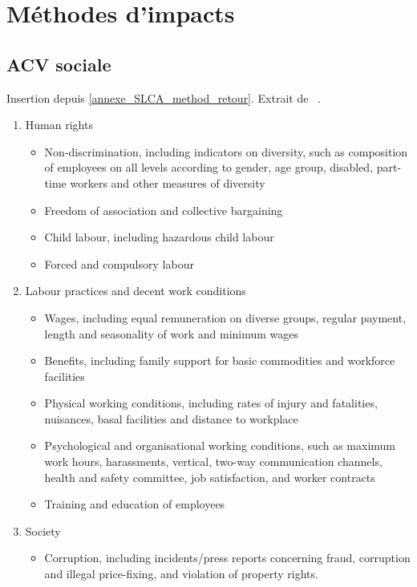\section{Méthodes d'impacts}
\subsection{ACV sociale}
\label{annexe_SLCA_method}
Insertion depuis \ref{annexe_SLCA_method_retour}.
Extrait de ~\cite[Table 1: Impact categories and indicators at midpoint level]{jorgensen_methodologies_2008}.
{\scriptsize
  \begin{enumerate}
   \item Human rights
	\begin{itemize}
	\item Non-discrimination, including indicators on diversity, such as composition of employees on all levels according to gender, age group, disabled, part-time workers and other measures of diversity 
	\item Freedom of association and collective bargaining 
	\item Child labour, including hazardous child labour 
	\item Forced and compulsory labour
	\end{itemize}
  \item Labour practices and decent work conditions 
       \begin{itemize}
        \item Wages, including equal remuneration on diverse groups, regular payment, length and seasonality of work and minimum wages
        \item Benefits, including family support for basic commodities and workforce facilities 
	\item Physical working conditions, including rates of injury and fatalities, nuisances, basal facilities and distance to workplace 
	\item Psychological and organisational working conditions, such as maximum work hours, harassments, vertical, two-way communication channels, health and safety committee, job satisfaction, and worker contracts
	\item Training and education of employees
       \end{itemize}
  \item Society
      \begin{itemize}
	\item Corruption, including incidents/press reports concerning fraud, corruption and illegal price-fixing, and violation of property rights.

\end{itemize}
\end{enumerate}}
